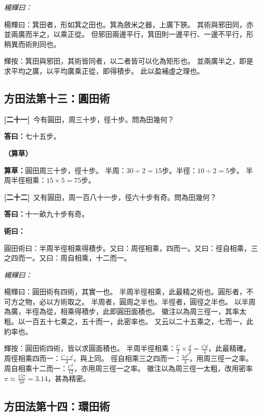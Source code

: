 \documentclass[11pt,a4paper]{article}
\newenvironment{method}{%
  \par\noindent\textcolor{methodcolor}{\textbf{術曰：}}%
  \ignorespaces
}{\par\vspace{0.5em}}
\newenvironment{caocao}{%
  \par\noindent\textcolor{caocaocolor}{\small\textbf{（算草）}}%
  \ignorespaces
}{\par\vspace{0.5em}}
\newenvironment{yanghuicomment}{%
  \par\noindent\textcolor{commentarycolor}{\small\textit{楊輝曰：}}%
  \ignorespaces
}{\par\vspace{0.5em}}
\newcommand{\problemnum}[1]{\textbf{[\ignorespaces#1\unskip]}}
\begin{document}
\begin{yanghuicomment}
楊輝曰：箕田者，形如箕之田也。箕為斂米之器，上廣下狹。
其術與邪田同，亦並兩廣而半之，以乘正從。
但邪田兩邊平行，箕田則一邊平行、一邊不平行，形稍異而術則同也。

輝按：箕田與邪田，其術皆同者，以二者皆可以化為矩形也。
並兩廣半之，即是求平均之廣，以平均廣乘正從，即得積步。
此以盈補虛之理也。
\end{yanghuicomment}

\subsection{方田法第十三：圓田術}

\noindent\problemnum{二十一}\,
今有圓田，周三十步，徑十步。問為田幾何？

\noindent\textcolor{answercolor}{\textbf{答曰：}}七十五步。

\begin{caocao}
\textbf{算草：}圓田周三十步，徑十步。
半周：$30 \div 2 = 15$步。半徑：$10 \div 2 = 5$步。
半周半徑相乘：$15 \times 5 = 75$步。
\end{caocao}

\noindent\problemnum{二十二}\,
又有圓田，周一百八十一步，徑六十步有奇。問為田幾何？

\noindent\textcolor{answercolor}{\textbf{答曰：}}十一畝九十步有奇。

\begin{method}
圓田術曰：半周半徑相乘得積步。又曰：周徑相乘，四而一。又曰：徑自相乘，三之四而一。又曰：周自相乘，十二而一。
\end{method}

\begin{yanghuicomment}
楊輝曰：圓田術有四術，其實一也。
半周半徑相乘，此最精之術也。圓形者，不可方之物，必以方術取之。
半周者，圓周之半也。半徑者，圓徑之半也。
以半周為廣，半徑為從，相乘得積步，此即圓田面積也。
徽注以為周三徑一，其率太粗。以一百五十七乘之，五十而一，此密率也。
又云以二十五乘之，七而一，此約率也。

輝按：圓田術四術，皆以求圓面積也。
半周半徑相乘：$\frac{C}{2} \times \frac{d}{2} = \frac{Cd}{4}$，此最精確。
周徑相乘四而一：$\frac{C \times d}{4}$，與上同。
徑自相乘三之四而一：$\frac{3d^2}{4}$，用周三徑一之率。
周自相乘十二而一：$\frac{C^2}{12}$，亦用周三徑一之率。
徽注以為周三徑一太粗，改用密率$\pi \approx \frac{157}{50} = 3.14$，甚為精密。
\end{yanghuicomment}

\subsection{方田法第十四：環田術}
\end{document}
